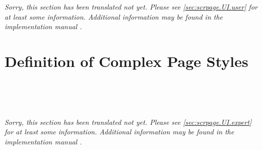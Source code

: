 \emph{Sorry, this section has been translated not yet. Please see
  \autoref{sec:scrpage.UI.user} for at least some
  information. Additional information may be found in the implementation
  manual .}


\section{Definition of Complex Page Styles}
\label{sec:scrlayer-scrpage.pagestyle.experts}
 
\begin{Declaration}
  \\
  \\
  \\
\end{Declaration}
%
%
%
%

%
%
%
%
%

\begin{Declaration}
\end{Declaration}
%
%
%

\emph{Sorry, this section has been translated not yet. Please see
  \autoref{sec:scrpage.UI.expert} for at least some
  information. Additional information may be found in the implementation
  manual .}
%
%


